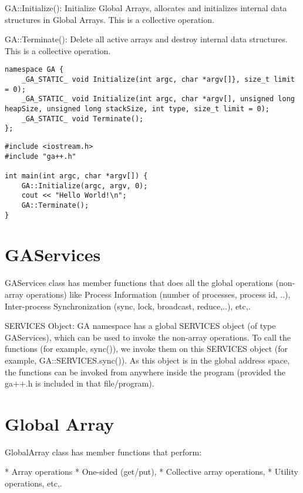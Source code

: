 GA::Initialize(): Initialize Global Arrays, allocates and initializes
internal data structures in Global Arrays. This is a collective operation.

GA::Terminate(): Delete all active arrays and destroy internal data
structures. This is a collective operation.

\begin{lstlisting}[style=cpp]
namespace GA { 
    _GA_STATIC_ void Initialize(int argc, char *argv[]}, size_t limit = 0); 
    _GA_STATIC_ void Initialize(int argc, char *argv[], unsigned long heapSize, unsigned long stackSize, int type, size_t limit = 0); 
    _GA_STATIC_ void Terminate();
};
\end{lstlisting}

\noindent \emph{}
\begin{lstlisting}[style=cppnoframe]
#include <iostream.h> 
#include "ga++.h"

int main(int argc, char *argv[]) { 
    GA::Initialize(argc, argv, 0); 
    cout << "Hello World!\n";
    GA::Terminate(); 
}
\end{lstlisting}

\section{GAServices}

GAServices class has member functions that does all the global operations
(non-array operations) like Process Information (number of processes,
process id, ..), Inter-process Synchronization (sync, lock, broadcast,
reduce,..), etc,.

SERVICES Object: GA namespace has a global \textquotedbl{}SERVICES\textquotedbl{}
object (of type \textquotedbl{}GAServices\textquotedbl{}), which can
be used to invoke the non-array operations. To call the functions
(for example, sync()), we invoke them on this SERVICES object (for
example, GA::SERVICES.sync()). As this object is in the global address
space, the functions can be invoked from anywhere inside the program
(provided the ga++.h is included in that file/program). 


\section{Global Array}

GlobalArray class has member functions that perform:

{*} Array operations {*} One-sided (get/put), {*} Collective array
operations, {*} Utility operations, etc,. 
